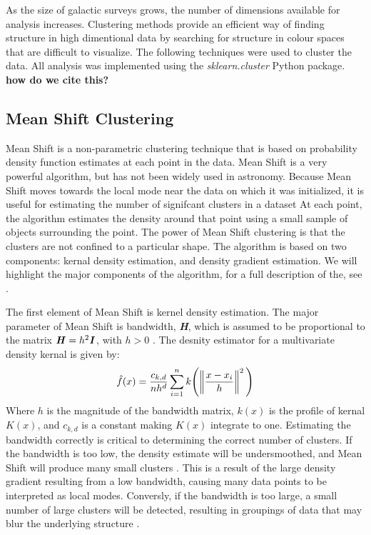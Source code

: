 As the size of galactic surveys grows, the number of dimensions available for analysis increases.
Clustering methods provide an efficient way of finding structure in high dimentional data by searching for structure in colour spaces that are difficult to visualize. 
The following techniques were used to cluster the data.
All analysis was implemented using the \textit{sklearn.cluster} Python package. \textbf{how do we cite this?} 

\subsection{Mean Shift Clustering} 
Mean Shift is a non-parametric clustering technique that is based on probability density function estimates at each point in the data. %
Mean Shift is a very powerful algorithm, but has not been widely used in astronomy. %
Because Mean Shift moves towards the local mode near the data on which it was initialized, it is useful for estimating the number of signifcant clusters in a dataset \citet{comanciciu02}
At each point, the algorithm estimates the density around that point using a small sample of objects surrounding the point.
The power of Mean Shift clustering is that the clusters are not confined to a particular shape.
The algorithm is based on two components: kernal density estimation, and density gradient estimation.
We will highlight the major components of the algorithm, for a full description of the, see \citet{vatturi09}.

The first element of Mean Shift is kernel density estimation. 
The major parameter of Mean Shift is bandwidth, \textbf{\textit{H}}, which is assumed to be proportional to the matrix $\textbf{\textit{H}} = h^2\textbf{\textit{I}}$, with $h>0$ \citet{vatturi09}.
The desnity estimator for a multivariate density kernal is given by: 
\begin{equation} 
\label{eq:ms_de}
\hat{f}(x) = \frac{c_{k,d}}{nh^d} \sum_{i=1}^n k\Bigg( \norm{\frac{x-x_{i}}{h}}^2 \Bigg)
\end{equation}
Where $h$ is the magnitude of the bandwidth matrix, $k(x)$ is the profile of kernal $K(x)$, and $c_{k,d}$ is a constant making $K(x)$ integrate to one\citet{vatturi09}.
Estimating the bandwidth correctly is critical to determining the correct number of clusters.
If the bandwidth is too low, the density estimate will be undersmoothed, and Mean Shift will produce many small clusters \citet{vatturi09}. This is a result of the large density gradient resulting from a low bandwidth, causing many data points to be interpreted as local modes.
Conversly, if the bandwidth is too large, a small number of large clusters will be detected, resulting in groupings of data that may blur the underlying structure \citet{vatturi09}.

